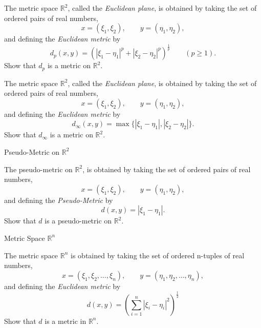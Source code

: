 \documentclass[12pt, a4paper]{article}
\begin{document}
\clearpage

\begin{theorem}
    The metric space $\mathbb{R}^2$, called the \emph{Euclidean plane}, is obtained by
    taking the set of ordered pairs of real numbers,
    \[
    x=(\xi_1,\xi_2), \qquad y=(\eta_1,\eta_2),
    \]
    and defining the \emph{Euclidean metric} by
    \[
    d_p(x,y)=\left(|\xi_1-\eta_1|^p+|\xi_2-\eta_2|^p\right)^{\frac{1}{p}} \qquad (p\ge 1).
    \]
    Show that $d_p$ is a metric on $\mathbb{R}^2$.
\end{theorem}

\clearpage

\begin{theorem}
    The metric space $\mathbb{R}^2$, called the \emph{Euclidean plane}, is obtained by
    taking the set of ordered pairs of real numbers,
    \[
    x=(\xi_1,\xi_2), \qquad y=(\eta_1,\eta_2),
    \]
    and defining the \emph{Euclidean metric} by
    \[
    d_\infty(x,y)=\max\{|\xi_1-\eta_1|,|\xi_2-\eta_2|\}.
    \]
    Show that $d_{\infty}$ is a metric on $\mathbb{R}^2$.
\end{theorem}

\clearpage

\begin{heading}
    Pseudo-Metric on $\mathbb{R}^2$
\end{heading}

\vspace{10pt}

\begin{problem}
    The pseudo-metric on $\mathbb{R}^2$, is obtained by
    taking the set of ordered pairs of real numbers,
    \[
    x=(\xi_1,\xi_2), \qquad y=(\eta_1,\eta_2),
    \]
    and defining the \emph{Pseudo-Metric} by
    \[
    d(x,y)=|\xi_1-\eta_1|.
    \]
    Show that $d$ is a pseudo-metric on $\mathbb{R}^2$.
\end{problem}

\clearpage

\clearpage

\begin{heading}
    Metric Space $\mathbb{R}^n$
\end{heading}

\vspace{10pt}

\begin{theorem}
    The metric space $\mathbb{R}^n$ is obtained by taking the set of ordered n-tuples of
    real numbers,
    \[
    x=(\xi_1,\xi_2,\ldots,\xi_n), \qquad y=(\eta_1,\eta_2,\ldots,\eta_n),
    \]
    and defining the \emph{Euclidean metric} by
    \[
    d(x,y)=\left(\sum_{i=1}^{n}|\xi_i-\eta_i|^2\right)^{\frac{1}{2}} 
    \]
    Show that $d$ is a metric in $\mathbb{R}^n$.
\end{theorem}
\end{document}
